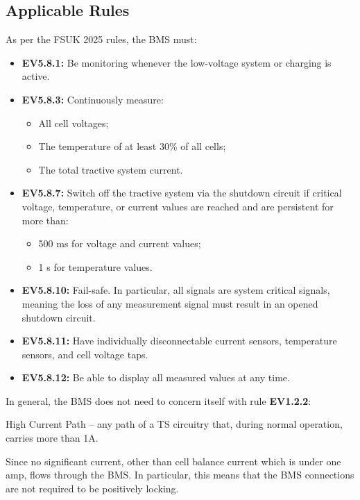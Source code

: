 \documentclass[12pt, a4paper]{article}
\begin{document}
\subsection{Applicable Rules}
As per the FSUK 2025 rules, the BMS must:
\begin{itemize}
\item\textbf{EV5.8.1:} Be monitoring whenever the low-voltage system or charging is active.
\item\textbf{EV5.8.3:} Continuously measure:
  \begin{itemize}
  \item All cell voltages;
  \item The temperature of at least 30\% of all cells;
  \item The total tractive system current.
  \end{itemize}
\item\textbf{EV5.8.7:} Switch off the tractive system via the shutdown circuit if critical voltage, temperature, or current values are reached and are persistent for more than:
  \begin{itemize}
  \item 500 ms for voltage and current values;
  \item 1 s for temperature values.
  \end{itemize}
\item\textbf{EV5.8.10:} Fail-safe.
  In particular, all signals are system critical signals, meaning the loss of any measurement signal must result in an opened shutdown circuit.
\item\textbf{EV5.8.11:} Have individually disconnectable current sensors, temperature sensors, and cell voltage taps.
\item\textbf{EV5.8.12:} Be able to display all measured values at any time.
\end{itemize}

In general, the BMS does not need to concern itself with rule \textbf{EV1.2.2}:
\begin{displayquote}
  High Current Path -- any path of a TS circuitry that, during normal operation, carries more than 1A.
\end{displayquote}
Since no significant current, other than cell balance current which is under one amp, flows through the BMS.
In particular, this means that the BMS connections are not required to be positively locking.
\end{document}
